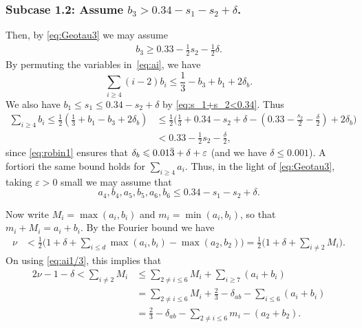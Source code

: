 \subsubsection*{Subcase 1.2:  Assume $b_3> 0.34-s_1-s_2+\delta$.}
Then, by \eqref{eq:Geotau3} we may assume
\begin{align}\label{eq:b3}
b_3\geq 0.33 -\frac{1}{2}s_2-\frac{1}{2}\delta.
\end{align}
By permuting the variables in~\eqref{eq:ai}, we have
$$
\sum_{i\ge4} (i-2)b_i\le\frac{1}{3}-b_3+b_1 + 2\delta_b.
$$
We also have
$b_1\leq s_1\leq 0.34 -s_2+\delta$
by \eqref{eq:s_1+s_2<0.34}.
Thus
\begin{align*}
\sum_{i\geq 4}b_i  \le \frac{1}{2}\left(\frac{1}{3}+b_1-b_3+2\delta_b\right)
&\le \frac{1}{2}\Big(\frac{1}{3}+0.34
-s_2+\delta
-
(0.33
-\frac{s_2}{2}
-\frac{\delta}{2})
+2\delta_b\Big)\\  &<  0.33-\frac{1}{2}s_2-\frac{\delta}{2},
\end{align*}
since
\eqref{eq:robin1} ensures that $\delta_b\leqslant 0.01\bar 3+\delta+\varepsilon$ (and we have $\delta\leq 0.001$). A fortiori the same bound holds for $\sum_{i\geq 4}a_i$. Thus, in the light of \eqref{eq:Geotau3}, taking $\varepsilon>0$ small we may assume that
$$
a_4,b_4,a_5,b_5,a_6,b_6\leq 0.34-s_1-s_2+\delta.
$$

Now write $M_i = \max(a_i,b_i)$ and  $m_i = \min(a_i,b_i)$, so that  $m_i+M_i=a_i+b_i$. By the Fourier bound we have
\begin{align*}
\nu & < \frac{1}{2}\Big(1+\delta+ \sum_{i\leq d} \max(a_i,b_i) - \max(a_2,b_2)\Big) = \frac{1}{2}\Big(1 +\delta+ \sum_{i\neq 2}M_i\Big).
\end{align*}
On using \eqref{eq:ai1/3},
this implies that
\begin{align*}
2\nu -1-\delta  < \sum_{i\neq 2} M_i  &\le \sum_{2\neq i \le 6}M_i + \sum_{i\ge7} (a_i+b_i)\\
&= \sum_{2\neq i \le 6}M_i + \frac{2}{3} -\delta_{ab} - \sum_{i\le 6}(a_i+b_i)\\
&= \frac{2}{3} -\delta_{ab}-\sum_{2\neq i \le 6}m_i - (a_2+b_2).
\end{align*}

